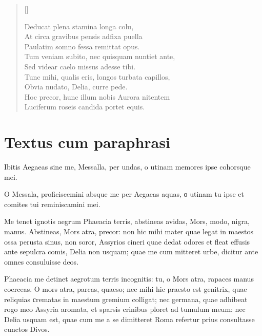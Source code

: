 \begin{verse}[\versewidth]
\begin{altverse}
{Deducat plena stamina longa colu,\\
At circa gravibus pensis adfixa puella\\
Paulatim somno fessa remittat opus.\\
Tum veniam subito, nec quisquam nuntiet ante,\\
Sed videar caelo missus adesse tibi.\\
Tunc mihi, qualis eris, longos turbata capillos,\\
Obvia nudato, Delia, curre pede.\\
Hoc precor, hunc illum nobis Aurora nitentem\\
Luciferum roseis candida portet equis.\\

}
\end{altverse}
\end{verse}

\newpage

\section*{Textus cum paraphrasi}

{\large

\noindent Ibitis Aegaeas sine me, Messalla, per undas, o utinam memores ipse cohorsque mei.\\

}


\noindent O Messala, proficiscemini absque me per Aegaeas aquas, о utinam tu ipse et comites tui reminiscamini mei.\\

{\large

\noindent Me tenet ignotis aegrum Phaeacia terris, abstineas avidas, Mors, modo, nigra, manus. Abstineas, Mors atra, precor: non hic mihi mater quae legat in maestos ossa perusta sinus, non soror, Assyrios cineri quae dedat odores et fleat effusis ante sepulcra comis, Delia non usquam; quae me cum mitteret urbe, dicitur ante omnes consuluisse deos.\\

}


\noindent Phaeacia me detinet aegrotum terris incognitis: tu, o Mors atra, rapaces manus coerceas. O mors atra, parcas, quaeso; nec mihi hic praesto est genitrix, quae reliquias сrematas in maestum gremium colligat; nec germana, quae adhibeat rogo meo Assyria aromata, et sparsis crinibus ploret ad tumulum meum: nec Delia usquam est, quae cum me a se dimitteret Roma refertur prius consultasse cunctos Divos. \\


